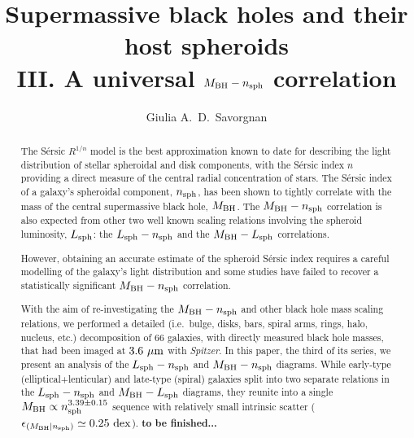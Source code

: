 \documentclass[preprint2]{emulateapj}
\begin{document}
\title{Supermassive black holes and their host spheroids \\ 
III. A universal $M_{\rm BH} - n_{\rm sph}$ correlation }


\author{Giulia A.~D.~Savorgnan}


\begin{abstract}
The S\'ersic $R^{1/n}$ model is the best approximation known to date for describing the light distribution of stellar spheroidal and disk components, 
with the S\'ersic index $n$ providing a direct measure of the central radial concentration of stars. 
The S\'ersic index of a galaxy's spheroidal component, $n_{\rm sph}$, has been shown to tightly correlate 
with the mass of the central supermassive black hole, $M_{\rm BH}$. 
The $M_{\rm BH} - n_{\rm sph}$ correlation is also expected from other two well known scaling relations 
involving the spheroid luminosity, $L_{\rm sph}$: 
the $L_{\rm sph} - n_{\rm sph}$ and the $M_{\rm BH} - L_{\rm sph}$ correlations. 

However, obtaining an accurate estimate of the spheroid S\'ersic index requires a careful modelling of the galaxy's light distribution 
and some studies have failed to recover a statistically significant $M_{\rm BH} - n_{\rm sph}$ correlation. 

With the aim of re-investigating the $M_{\rm BH} - n_{\rm sph}$ 
and other black hole mass scaling relations, 
we performed a detailed (i.e.~bulge, disks, bars, spiral arms, rings, halo, nucleus, etc.) 
decomposition of 66 galaxies, with directly measured black hole masses, 
that had been imaged at $3.6\rm~\mu m$ with \emph{Spitzer}. 
In this paper, the third of its series, we present an analysis of the $L_{\rm sph} - n_{\rm sph}$ and $M_{\rm BH} - n_{\rm sph}$ diagrams. 
While early-type (elliptical+lenticular) and late-type (spiral) galaxies split into two separate relations 
in the $L_{\rm sph} - n_{\rm sph}$ and $M_{\rm BH} - L_{\rm sph}$ diagrams, 
they reunite into a single $M_{\rm BH} \propto n_{\rm sph}^{3.39 \pm 0.15}$ sequence
with relatively small intrinsic scatter ($\epsilon_{(M_{\rm BH} | n_{\rm sph})} \simeq 0.25 \rm~dex$). 
{\bf to be finished...}
\end{abstract}


\end{document}
